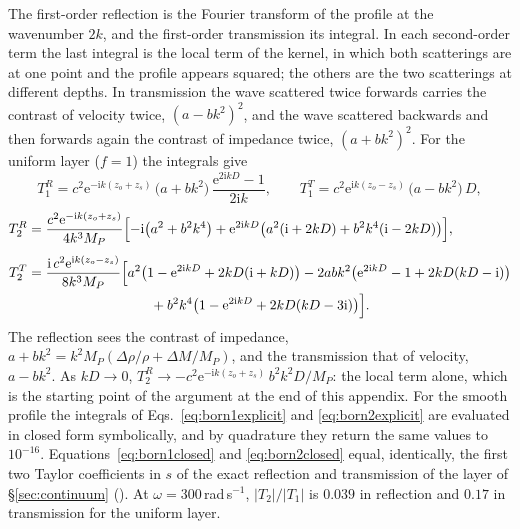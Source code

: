 \documentclass[preprint,review,12pt]{elsarticle}
\begin{document}
The first-order reflection is the Fourier transform of the profile at the wavenumber $2k$, and the
first-order transmission its integral. In each second-order term the last integral is the local term of
the kernel, in which both scatterings are at one point and the profile appears squared; the others are
the two scatterings at different depths. In transmission the wave scattered twice forwards carries the
contrast of velocity twice, $(a-bk^2)^2$, and the wave scattered backwards and then forwards again the
contrast of impedance twice, $(a+bk^2)^2$. For the uniform layer ($f=1$) the integrals give
\begin{equation}\label{eq:born1closed}
  T_1^{R}=c^2\mathrm{e}^{-\mathrm{i}k(z_o+z_s)}\,\bigl(a+bk^2\bigr)\,
          \frac{\mathrm{e}^{2\mathrm{i}kD}-1}{2\mathrm{i}k},
  \qquad
  T_1^{T}=c^2\mathrm{e}^{\mathrm{i}k(z_o-z_s)}\,\bigl(a-bk^2\bigr)\,D,
\end{equation}
\begin{equation}\label{eq:born2closed}
\begin{aligned}
  T_2^{R}&=\frac{c^2\mathrm{e}^{-\mathrm{i}k(z_o+z_s)}}{4k^3M_P}
     \Bigl[-\mathrm{i}\bigl(a^2+b^2k^4\bigr)
     +\mathrm{e}^{2\mathrm{i}kD}\bigl(a^2(\mathrm{i}+2kD)+b^2k^4(\mathrm{i}-2kD)\bigr)\Bigr],\\[4pt]
  T_2^{T}&=\frac{\mathrm{i}\,c^2\mathrm{e}^{\mathrm{i}k(z_o-z_s)}}{8k^3M_P}
     \Bigl[a^2\bigl(1-\mathrm{e}^{2\mathrm{i}kD}+2kD(\mathrm{i}+kD)\bigr)
     -2abk^2\bigl(\mathrm{e}^{2\mathrm{i}kD}-1+2kD(kD-\mathrm{i})\bigr)\\
     &\hspace{9em}+b^2k^4\bigl(1-\mathrm{e}^{2\mathrm{i}kD}+2kD(kD-3\mathrm{i})\bigr)\Bigr].
\end{aligned}
\end{equation}
The reflection sees the contrast of impedance, $a+bk^2=k^2M_P(\Delta\rho/\rho+\Delta M/M_P)$, and the
transmission that of velocity, $a-bk^2$. As $kD\to0$, $T_2^{R}\to-c^2\mathrm{e}^{-\mathrm{i}k(z_o+z_s)}\,
b^2k^2D/M_P$: the local term alone, which is the starting point of the argument at the end of this appendix. For the smooth
profile the integrals of Eqs.~\eqref{eq:born1explicit} and \eqref{eq:born2explicit} are evaluated in
closed form symbolically, and by quadrature they return the same values to $10^{-16}$.
Equations~\eqref{eq:born1closed} and \eqref{eq:born2closed} equal, identically, the first two Taylor
coefficients in $s$ of the exact
reflection and transmission of the layer of \S\ref{sec:continuum} ().
At $\omega=300$\,rad\,s$^{-1}$, $\lvert T_2\rvert/\lvert T_1\rvert$ is $0.039$ in reflection and $0.17$
in transmission for the uniform layer.
\end{document}
